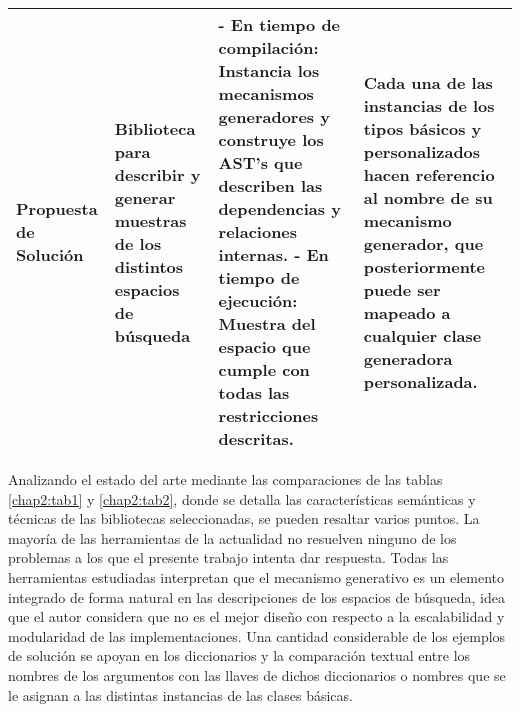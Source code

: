 \begin{longtable}{  p{2.5cm}  p{4cm}  p{6.8cm}  p{6.5cm} }
    \hline
    \rowcolor{lavender}
    Propuesta de Solución                                                                                                                                                                                                                                                                                                                                         &
    Biblioteca para describir y generar muestras de los distintos espacios de búsqueda                                                                                                                                                                                                                                                                            &
    - En tiempo de compilación: Instancia los mecanismos generadores y construye los AST's que describen las dependencias y relaciones internas. \newline- En tiempo de ejecución: Muestra del espacio que cumple con todas las restricciones descritas.                                                                                                            &
    Cada una de las instancias de los tipos básicos y personalizados hacen referencio al nombre de su mecanismo generador, que posteriormente puede ser mapeado a cualquier clase generadora personalizada.                                                                                                                                                          \\
    \hline
\end{longtable}




Analizando el estado del arte mediante las comparaciones de las tablas \ref{chap2:tab1} y \ref{chap2:tab2},
donde se detalla las características semánticas y técnicas de las bibliotecas
seleccionadas, se pueden resaltar varios puntos. La mayoría de las herramientas de la
actualidad no resuelven ninguno de los problemas a los que el presente trabajo
intenta dar respuesta. Todas las herramientas estudiadas interpretan que el
mecanismo generativo es un elemento integrado de forma natural en las descripciones
de los espacios de búsqueda, idea que el autor considera que no es el mejor
diseño con respecto a la escalabilidad y modularidad de las implementaciones.
Una cantidad considerable de los ejemplos de solución se apoyan en los diccionarios
y la comparación textual entre los nombres de los argumentos con las llaves
de dichos diccionarios o nombres que se le asignan a las distintas instancias de
las clases básicas.

